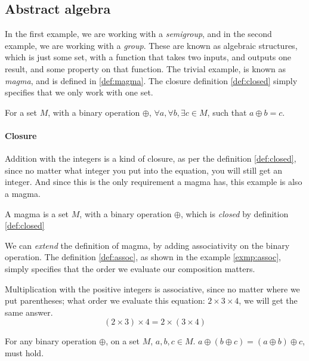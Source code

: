 \subsection{Abstract algebra}

In the first example, we are working with a \textit{semigroup}, and in the
second example, we are working with a \textit{group}. These are known as
algebraic structures, which is just some set, with a function that takes two
inputs, and outputs one result, and some property on that function. The trivial
example, is known as \textit{magma}, and is defined in \ref{def:magma}. The
closure definition \ref{def:closed} simply specifies that we only work with one
set.

\begin{definition}[Closure] \label{def:closed}
  For a set $M$, with a binary operation $\oplus$,
  $\forall a, \forall b, \exists c \in M$, such that
  $a \oplus b = c$.
\end{definition}

\paragraph{Closure} Addition with the integers is a kind of closure, as per the
definition \ref{def:closed}, since no matter what integer you put into the
equation, you will still get an integer. And since this is the only requirement a
magma has, this example is also a magma.

\begin{definition}[Magma] \label{def:magma}
  A magma is a set $M$, with a binary operation $\oplus$, which is
  \textit{closed} by definition \ref{def:closed}
\end{definition}

We can \textit{extend} the definition of magma, by adding associativity on the
binary operation. The definition \ref{def:assoc}, as shown in the example
\ref{exmp:assoc},
simply specifies that the order we evaluate our composition matters.

\begin{exmp} \label{exmp:assoc}
  Multiplication with the positive integers is associative, since no matter
  where we put parentheses; what order we evaluate this equation:
  $2 \times 3 \times 4$, we will get the same answer.
  $$
  (2 \times 3) \times 4 = 2 \times (3 \times 4)
  $$
\end{exmp}

\begin{definition} \label{def:assoc}
  For any binary operation $\oplus$, on a set $M$, $a, b, c \in M$.
  $a \oplus \left ( b \oplus c \right ) = \left ( a \oplus b \right ) \oplus c$,
  must hold.
\end{definition}

